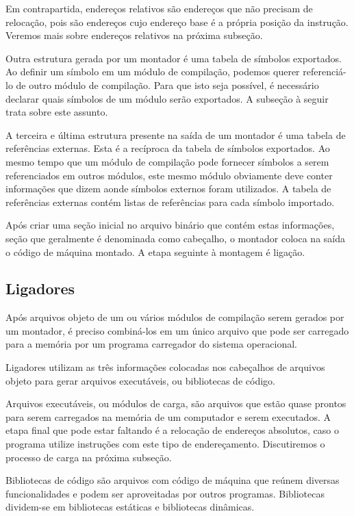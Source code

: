 Em contrapartida, endereços relativos são endereços que não precisam de
relocação, pois são endereços cujo endereço base é a própria posição da
instrução. Veremos mais sobre endereços relativos na próxima subseção.

Outra estrutura gerada por um montador é uma tabela de símbolos exportados. Ao
definir um símbolo em um módulo de compilação, podemos querer referenciá-lo de
outro módulo de compilação. Para que isto seja possível, é necessário declarar
quais símbolos de um módulo serão exportados. A subseção à seguir trata sobre
este assunto.

A terceira e última estrutura presente na saída de um montador é uma tabela de
referências externas. Esta é a recíproca da tabela de símbolos exportados. Ao
mesmo tempo que um módulo de compilação pode fornecer símbolos a serem
referenciados em outros módulos, este mesmo módulo obviamente deve conter
informações que dizem aonde símbolos externos foram utilizados. A tabela de
referências externas contém listas de referências para cada símbolo importado.

Após criar uma seção inicial no arquivo binário que contém estas informações,
seção que geralmente é denominada como cabeçalho, o montador coloca na saída o
código de máquina montado. A etapa seguinte à montagem é ligação.

\subsection{Ligadores}

Após arquivos objeto de um ou vários módulos de compilação serem gerados por um
montador, é preciso combiná-los em um único arquivo que pode ser carregado para
a memória por um programa carregador do sistema operacional.

Ligadores utilizam as três informações colocadas nos cabeçalhos de arquivos
objeto para gerar arquivos executáveis, ou bibliotecas de código.

Arquivos executáveis, ou módulos de carga, são arquivos que estão quase prontos
para serem carregados na memória de um computador e serem executados. A etapa
final que pode estar faltando é a relocação de endereços absolutos, caso o
programa utilize instruções com este tipo de endereçamento. Discutiremos o
processo de carga na próxima subseção.

Bibliotecas de código são arquivos com código de máquina que reúnem diversas
funcionalidades e podem ser aproveitadas por outros programas. Bibliotecas
dividem-se em bibliotecas estáticas e bibliotecas dinâmicas.

